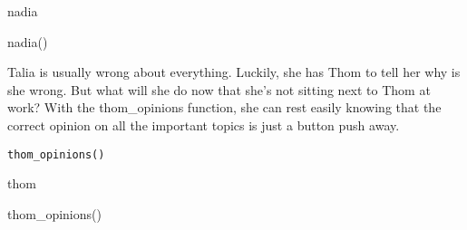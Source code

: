 \documentclass[a4paper]{book}
\begin{document}
%
\begin{Author}\relax
nadia
\end{Author}
%
\begin{Examples}
\begin{ExampleCode}
nadia()
\end{ExampleCode}
\end{Examples}
%
\begin{Description}\relax
Talia is usually wrong about everything. Luckily, she has Thom to tell her why is she wrong.
But what will she do now that she's not sitting next to Thom at work? With the thom\_opinions function,
she can rest easily knowing that the correct opinion on all the important topics is just a button push away.
\end{Description}
%
\begin{Usage}
\begin{verbatim}
thom_opinions()
\end{verbatim}
\end{Usage}
%
\begin{Author}\relax
thom
\end{Author}
%
\begin{Examples}
\begin{ExampleCode}
thom_opinions()

\end{ExampleCode}
\end{Examples}
\printindex{}
\end{document}
